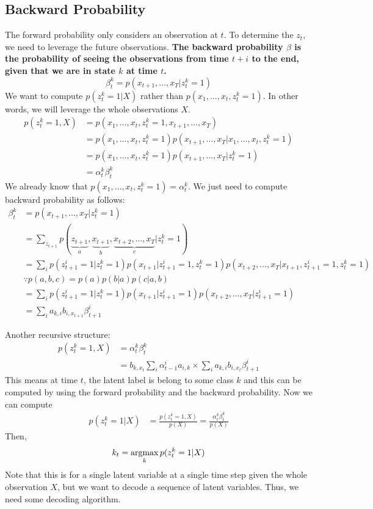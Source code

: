 \subsection{Backward Probability}
The forward probability only considers an observation at $t$. To determine the $z_t$, we need to leverage the future observations. \textbf{The backward probability $\beta$ is the probability of seeing the observations from time $t+i$ to the end, given that we are in state $k$ at time $t$.} 
$$\beta_t^k = p(x_{t+1},\dots,x_T|z_t^k=1)$$
We want to compute $p(z_t^k=1|X)$ rather than $p(x_1,\dots,x_t, z_t^k=1)$. In other words, we will leverage the whole observations $X$. 
\begin{align*}
	p(z_t^k=1,X) &= p(x_1,\dots,x_t, z_t^k=1, x_{t+1},\dots,x_T)\\
	& = p(x_1,\dots,x_t, z_t^k=1)p(x_{t+1},\dots,x_T|x_1,\dots,x_t, z_t^k=1)\\
	& = p(x_1,\dots,x_t, z_t^k=1)p(x_{t+1},\dots,x_T|z_t^k=1)\\
	& = \alpha_{t}^k\beta_{t}^k
\end{align*}
We already know that $p(x_1,\dots,x_t, z_t^k=1) = \alpha_t^k$. We just need to compute backward probability as follows:
\begin{align*}
	\beta_t^k &= p(x_{t+1},\dots,x_T|z_t^k=1)\\
	& = \sum_{z_{t+1}}p(\underbrace{z_{t+1}}_{a}, \underbrace{x_{t+1}}_b,\underbrace{x_{t+2},\dots,x_T}_c|z_t^k=1)\\
	& = \sum_{i} p(z_{t+1}^i=1|z_t^k=1)p(x_{t+1}|z_{t+1}^i=1,z_t^k=1)p(x_{t+2},\dots,x_T|x_{t+1},z_{t+1}^i=1,z_t^k=1)\\
	& \because p(a,b,c) = p(a)p(b|a)p(c|a,b)\\
	& = \sum_{i} p(z_{t+1}^i=1|z_t^k=1)p(x_{t+1}|z_{t+1}^i=1)p(x_{t+2},\dots,x_T|z_{t+1}^i=1)\\
	& = \sum_{i}a_{k,i}b_{i,x_{t+1}} \beta_{t+1}^i
\end{align*}

Another recursive structure:
\begin{align*}
	p(z_t^k=1,X) &= \alpha_{t}^k\beta_{t}^k\\
	& = b_{k,x_t}\sum_i \alpha_{t-1}^ia_{i,k} \times \sum_{i}a_{k,i}b_{i,x_{t}} \beta_{t+1}^i
\end{align*}
This means at time $t$, the latent label is belong to some class $k$ and this can be computed by using the forward probability and the backward probability. Now we can compute
\begin{align*}
p(z_t^k=1|X) &= \frac{p(z_t^k=1,X)}{p(X)} = \frac{\alpha_{t}^k\beta_{t}^k}{p(X)}
\end{align*}
Then, 
$$k_t = \operatorname*{\operatorname{argmax}}_{k}p(z_t^k=1|X)$$
Note that this is for a single latent variable at a single time step given the whole observation $X$, but we want to decode a sequence of latent variables. Thus, we need some decoding algorithm.
